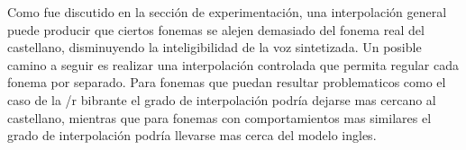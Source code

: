 
Como fue discutido en la sección de experimentación, una interpolación general puede producir que ciertos fonemas se alejen demasiado del fonema real del castellano, disminuyendo la inteligibilidad de la voz sintetizada. Un posible camino a seguir es realizar una interpolación controlada que permita regular cada fonema por separado. Para fonemas que puedan resultar problematicos como el caso de la /r bibrante el grado de interpolación podría dejarse mas cercano al castellano, mientras que para fonemas con comportamientos mas similares el grado de interpolación podría llevarse mas cerca del modelo ingles.

